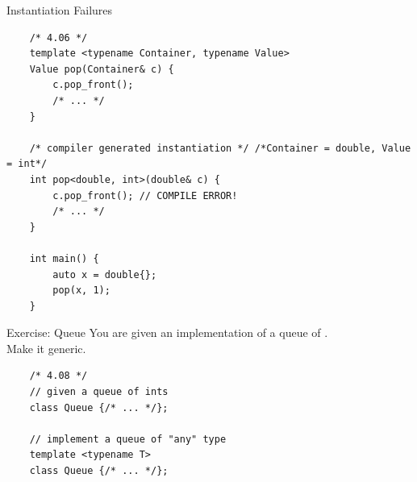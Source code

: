 \begin{frame}[fragile]{Instantiation Failures}
  \begin{verbatim}
    /* 4.06 */
    template <typename Container, typename Value>
    Value pop(Container& c) {
        c.pop_front();
        /* ... */
    }

    /* compiler generated instantiation */ /*Container = double, Value = int*/
    int pop<double, int>(double& c) {
        c.pop_front(); // COMPILE ERROR!
        /* ... */
    }

    int main() {
        auto x = double{};
        pop(x, 1);
    }
  \end{verbatim}
\end{frame}

\begin{frame}[fragile]{Exercise: Queue}
  You are given an implementation of a queue of .\\
  Make it generic.

  \begin{verbatim}
    /* 4.08 */
    // given a queue of ints
    class Queue {/* ... */};

    // implement a queue of "any" type
    template <typename T>
    class Queue {/* ... */};
  \end{verbatim}
\end{frame}